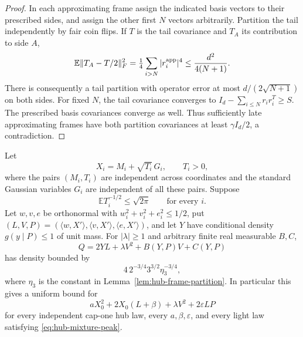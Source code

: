 \begin{proof}
In each approximating frame assign the indicated basis vectors to
their prescribed sides, and assign the other first $N$ vectors
arbitrarily.  Partition the tail independently by fair coin flips.
If $T$ is the tail covariance and $T_A$ its contribution to side $A$,
\[
 \mathbb E\|T_A-T/2\|_F^2
 =\tfrac14\sum_{i>N}|r_i^{\rm app}|^4
 \le\frac{d^2}{4(N+1)}.
\]
There is consequently a tail partition with operator error at most
$d/(2\sqrt{N+1})$ on both sides.  For fixed $N$, the tail covariance
converges to $I_d-\sum_{i\le N}r_i r_i^T\ge S$.
The prescribed basis covariances converge as well.  Thus sufficiently
late approximating frames have both partition covariances at least
$\gamma I_d/2$, a contradiction.
\end{proof}

\begin{theorem}
\label{thm:hub-gaussian-mixtures}
Let
\[
 X_i=M_i+\sqrt{T_i}\,G_i,\qquad T_i>0,
\]
where the pairs $(M_i,T_i)$ are independent across coordinates and
the standard Gaussian variables $G_i$ are independent of all these
pairs.  Suppose
\begin{equation}\label{eq:hub-mixture-peak}
 \mathbb E T_i^{-1/2}\le\sqrt{2\pi}\qquad\text{for every }i.
\end{equation}
Let $w,v,e$ be orthonormal with
$w_i^2+v_i^2+e_i^2\le1/2$, put
$(L,V,P)=(\langle w,X'\rangle,\langle v,X'\rangle,
\langle e,X'\rangle)$, and let $Y$ have conditional density
$g(y\mid P)\le1$ of unit mass.
For $|\lambda|\ge1$ and arbitrary finite real measurable $B,C$,
\[
 Q=2YL+\lambda V^2+B(Y,P)V+C(Y,P)
\]
has density bounded by
\begin{equation}\label{eq:hub-mixture-bound}
 4\,2^{-3/4}3^{3/2}\eta_3^{-3/4},
\end{equation}
where $\eta_3$ is the constant in
Lemma~\ref{lem:hub-frame-partition}.
In particular this gives a uniform bound for
\[
 aX_0^2+2X_0(L+\beta)+\lambda V^2+2\varepsilon LP
\]
for every independent cap-one hub law, every $a,\beta,\varepsilon$,
and every light law satisfying \eqref{eq:hub-mixture-peak}.
\end{theorem}


